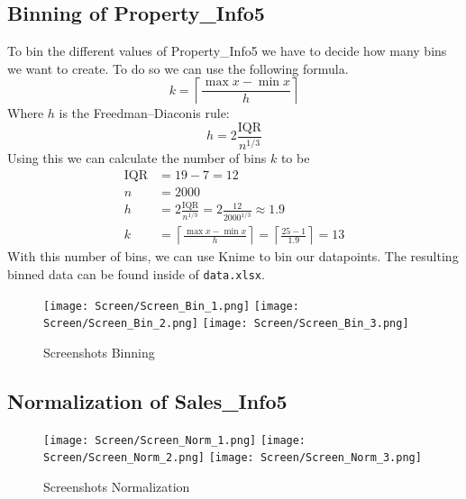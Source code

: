 \subsection{Binning of Property\_Info5}
To bin the different values of Property\_Info5 we have to decide how many bins we want to create. To do so we can use the following formula.
\begin{equation*}
k = \left \lceil \frac{\max x - \min x}{h} \right \rceil
\end{equation*}
Where $h$ is the Freedman–Diaconis rule:
\begin{equation*}
h=2\frac{\text{IQR}}{n^{1/3}}
\end{equation*}
Using this we can calculate the number of bins $k$ to be
\begin{align*}
\text{IQR} &= 19-7 = 12\\
n &= 2000\\
h&=2\frac{\text{IQR}}{n^{1/3}} = 2\frac{12}{2000^{1/3}} \approx 1.9\\
k&=\left \lceil \frac{\max x - \min x}{h} \right \rceil = \left \lceil \frac{25 - 1}{1.9} \right \rceil = 13
\end{align*}
With this number of bins, we can use Knime to bin our datapoints. The resulting binned data can be found inside of \texttt{data.xlsx}.
\begin{figure}[H]
	\begin{center}
		\texttt{[image: Screen/Screen\_Bin\_1.png]}
		\texttt{[image: Screen/Screen\_Bin\_2.png]}
		\texttt{[image: Screen/Screen\_Bin\_3.png]}
		
	\end{center}
	\caption{Screenshots Binning}
\end{figure}
\subsection{Normalization of Sales\_Info5}
\begin{figure}[H]
	\begin{center}
		\texttt{[image: Screen/Screen\_Norm\_1.png]}
		\texttt{[image: Screen/Screen\_Norm\_2.png]}
		\texttt{[image: Screen/Screen\_Norm\_3.png]}
		
	\end{center}
	\caption{Screenshots Normalization}
\end{figure}
